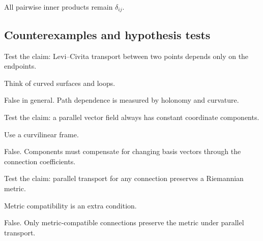\begin{solution}
All pairwise inner products remain \(\delta_{ij}\).
\end{solution}

\subsection*{Counterexamples and hypothesis tests}

\begin{exercise}\label{exr:vii24-ped-10}
Test the claim: Levi--Civita transport between two points depends only on the endpoints.
\end{exercise}

\begin{hint}
Think of curved surfaces and loops.
\end{hint}

\begin{solution}
False in general.  Path dependence is measured by holonomy and curvature.
\end{solution}

\begin{exercise}\label{exr:vii24-ped-11}
Test the claim: a parallel vector field always has constant coordinate components.
\end{exercise}

\begin{hint}
Use a curvilinear frame.
\end{hint}

\begin{solution}
False.  Components must compensate for changing basis vectors through the connection coefficients.
\end{solution}

\begin{exercise}\label{exr:vii24-ped-12}
Test the claim: parallel transport for any connection preserves a Riemannian metric.
\end{exercise}

\begin{hint}
Metric compatibility is an extra condition.
\end{hint}

\begin{solution}
False.  Only metric-compatible connections preserve the metric under parallel transport.
\end{solution}

